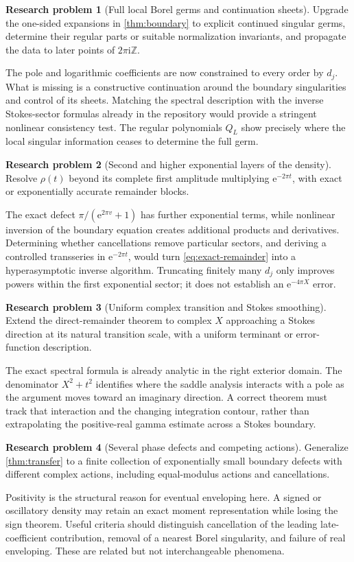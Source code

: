 \documentclass[11pt,a4paper]{article}
\theoremstyle{definition}
\newtheorem{problem}{Research problem}
\numberwithin{equation}{section}
\newcommand{\ii}{\mathrm{i}}
\newcommand{\ee}{\mathrm{e}}
\begin{document}
\begin{problem}[Full local Borel germs and continuation sheets]
Upgrade the one-sided expansions in \cref{thm:boundary} to explicit continued singular germs, determine their regular parts or suitable normalization invariants, and propagate the data to later points of $2\pi\ii\mathbb Z$.
\end{problem}
The pole and logarithmic coefficients are now constrained to every order by $d_j$. What is missing is a constructive continuation around the boundary singularities and control of its sheets. Matching the spectral description with the inverse Stokes-sector formulas already in the repository would provide a stringent nonlinear consistency test. The regular polynomials $Q_L$ show precisely where the local singular information ceases to determine the full germ.

\begin{problem}[Second and higher exponential layers of the density]
Resolve $\rho(t)$ beyond its complete first amplitude multiplying $\ee^{-2\pi t}$, with exact or exponentially accurate remainder blocks.
\end{problem}
The exact defect $\pi/(\ee^{2\pi v}+1)$ has further exponential terms, while nonlinear inversion of the boundary equation creates additional products and derivatives. Determining whether cancellations remove particular sectors, and deriving a controlled transseries in $\ee^{-2\pi t}$, would turn \eqref{eq:exact-remainder} into a hyperasymptotic inverse algorithm. Truncating finitely many $d_j$ only improves powers within the first exponential sector; it does not establish an $\ee^{-4\pi X}$ error.

\begin{problem}[Uniform complex transition and Stokes smoothing]
Extend the direct-remainder theorem to complex $X$ approaching a Stokes direction at its natural transition scale, with a uniform terminant or error-function description.
\end{problem}
The exact spectral formula is already analytic in the right exterior domain. The denominator $X^2+t^2$ identifies where the saddle analysis interacts with a pole as the argument moves toward an imaginary direction. A correct theorem must track that interaction and the changing integration contour, rather than extrapolating the positive-real gamma estimate across a Stokes boundary.

\begin{problem}[Several phase defects and competing actions]
Generalize \cref{thm:transfer} to a finite collection of exponentially small boundary defects with different complex actions, including equal-modulus actions and cancellations.
\end{problem}
Positivity is the structural reason for eventual enveloping here. A signed or oscillatory density may retain an exact moment representation while losing the sign theorem. Useful criteria should distinguish cancellation of the leading late-coefficient contribution, removal of a nearest Borel singularity, and failure of real enveloping. These are related but not interchangeable phenomena.
\end{document}
